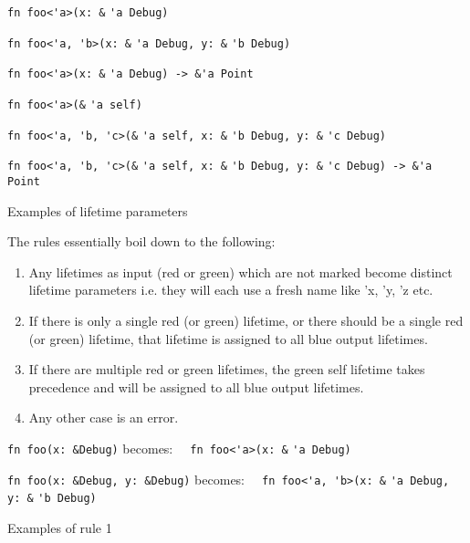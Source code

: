 \begin{fig}
{\verb|fn foo<'a>(x: &|}
{\color{red} \verb|'a|}{\verb| Debug)|}

{\verb|fn foo<'a, 'b>(x: &|}
{\color{red} \verb|'a|}{\verb| Debug, y: &|}{\color{red} \verb|'b|}{\verb| Debug)|}

{\verb|fn foo<'a>(x: &|}
{\color{red} \verb|'a|}{\verb| Debug) -> &|}{\color{blue}\verb|'a|}{\verb| Point|}

{\verb|fn foo<'a>(&|}
{\color{green} \verb|'a|}{\verb| self)|}

{\verb|fn foo<'a, 'b, 'c>(&|}
{\color{green} \verb|'a|}{\verb| self, x: &|}{\color{red} \verb|'b|}{\verb| Debug, y: &|}
{\color{red} \verb|'c|}{\verb| Debug)|}

{\verb|fn foo<'a, 'b, 'c>(&|}
{\color{green} \verb|'a|}{\verb| self, x: &|}{\color{red} \verb|'b|}{\verb| Debug, y: &|}
{\color{red}\verb|'c|}{\verb| Debug) -> &|}{\color{blue}\verb|'a|}{\verb| Point|}

\caption{Examples of lifetime parameters}
\label{Fig:lifetimes}
\end{fig}

The rules essentially boil down to the following:
\begin{enumerate}
\item Any lifetimes as input (red or green) which are not marked become distinct lifetime parameters i.e. they will each use a fresh name like 'x, 'y, 'z etc.
\item If there is only a single red (or green) lifetime, or there should be a single red (or green) lifetime, that lifetime is assigned to all blue output lifetimes.
\item If there are multiple red or green lifetimes, the green self lifetime takes precedence and will be assigned to all blue output lifetimes.
\item Any other case is an error.
\end{enumerate}

\begin{fig}
{\verb|fn foo(x: &Debug)|}\newline
becomes: {\verb|  fn foo<'a>(x: &|}
{\color{red} \verb|'a|}{\verb| Debug)|}

\vspace{4mm}

{\verb|fn foo(x: &Debug, y: &Debug)|}\newline
becomes: {\verb|  fn foo<'a, 'b>(x: &|}
{\color{red} \verb|'a|}{\verb| Debug, y: &|}{\color{red} \verb|'b|}{\verb| Debug)|}

\caption{Examples of rule 1}
\label{Fig:lifetimes2}
\end{fig}

